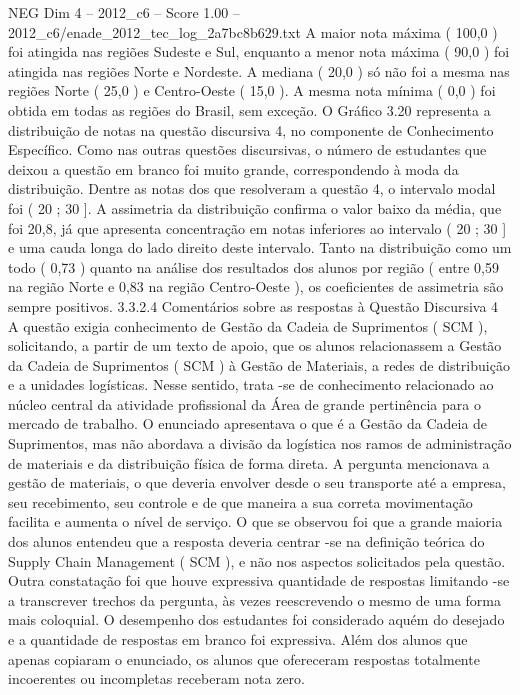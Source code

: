 \begin{textsample}{NEG Dim 4 – 2012\_c6 – Score 1.00 – 2012\_c6/enade\_2012\_tec\_log\_2a7bc8b629.txt}
A maior nota máxima ( 100,0 ) foi atingida nas regiões Sudeste e Sul, enquanto a menor nota máxima ( 90,0 ) foi atingida nas regiões Norte e Nordeste.
A mediana ( 20,0 ) só não foi a mesma nas regiões Norte ( 25,0 ) e Centro-Oeste ( 15,0 ).
A mesma nota mínima ( 0,0 ) foi obtida em todas as regiões do Brasil, sem exceção.
O Gráfico 3.20 representa a distribuição de notas na questão discursiva 4, no componente de Conhecimento Específico.
Como nas outras questões discursivas, o número de estudantes que deixou a questão em branco foi muito grande, correspondendo à moda da distribuição.
Dentre as notas dos que resolveram a questão 4, o intervalo modal foi ( 20 ; 30 ].
A assimetria da distribuição confirma o valor baixo da média, que foi 20,8, já que apresenta concentração em notas inferiores ao intervalo ( 20 ; 30 ] e uma cauda longa do lado direito deste intervalo.
Tanto na distribuição como um todo ( 0,73 ) quanto na análise dos resultados dos alunos por região ( entre 0,59 na região Norte e 0,83 na região Centro-Oeste ), os coeficientes de assimetria são sempre positivos. 3.3.2.4 Comentários sobre as respostas à Questão Discursiva 4 A questão exigia conhecimento de Gestão da Cadeia de Suprimentos ( SCM ), solicitando, a partir de um texto de apoio, que os alunos relacionassem a Gestão da Cadeia de Suprimentos ( SCM ) à Gestão de Materiais, a redes de distribuição e a unidades logísticas.
Nesse sentido, trata -se de conhecimento relacionado ao núcleo central da atividade profissional da Área de grande pertinência para o mercado de trabalho.
O enunciado apresentava o que é a Gestão da Cadeia de Suprimentos, mas não abordava a divisão da logística nos ramos de administração de materiais e da distribuição física de forma direta.
A pergunta mencionava a gestão de materiais, o que deveria envolver desde o seu transporte até a empresa, seu recebimento, seu controle e de que maneira a sua correta movimentação facilita e aumenta o nível de serviço.
O que se observou foi que a grande maioria dos alunos entendeu que a resposta deveria centrar -se na definição teórica do Supply Chain Management ( SCM ), e não nos aspectos solicitados pela questão.
Outra constatação foi que houve expressiva quantidade de respostas limitando -se a transcrever trechos da pergunta, às vezes reescrevendo o mesmo de uma forma mais coloquial.
O desempenho dos estudantes foi considerado aquém do desejado e a quantidade de respostas em branco foi expressiva.
Além dos alunos que apenas copiaram o enunciado, os alunos que ofereceram respostas totalmente incoerentes ou incompletas receberam nota zero.

\end{textsample}

